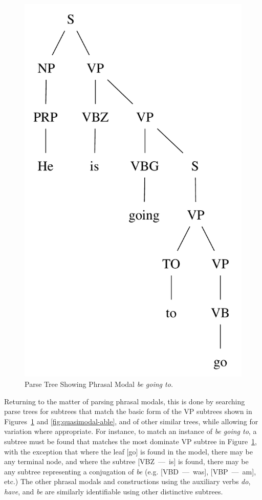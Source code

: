 \documentclass[main.tex]{subfiles}
\begin{document}
\begin{figure}[htbp]
\centering
\includegraphics[scale=0.6]{modal-going.pdf}
\caption{Parse Tree Showing Phrasal Modal \textit{be going to.}}
\label{fig:quasimodal-going}
\end{figure}

Returning to the matter of parsing phrasal modals, this is done by searching parse trees for subtrees that match the basic form of the VP subtrees shown in Figures~\ref{fig:quasimodal-going} and \ref{fig:quasimodal-able}, and of other similar trees, while allowing for variation where appropriate. For instance, to match an instance of \textit{be going to}, a subtree must be found that matches the most dominate VP subtree in Figure~\ref{fig:quasimodal-going}, with the exception that where the leaf [go] is found in the model, there may be any terminal node, and where the subtree [VBZ~---~is] is found, there may be any subtree representing a conjugation of \textit{be} (e.g. [VBD~---~was], [VBP~---~am], etc.) The other phrasal modals and constructions using the auxiliary verbs \textit{do}, \textit{have}, and \textit{be} are similarly identifiable using other distinctive subtrees.
\end{document}
